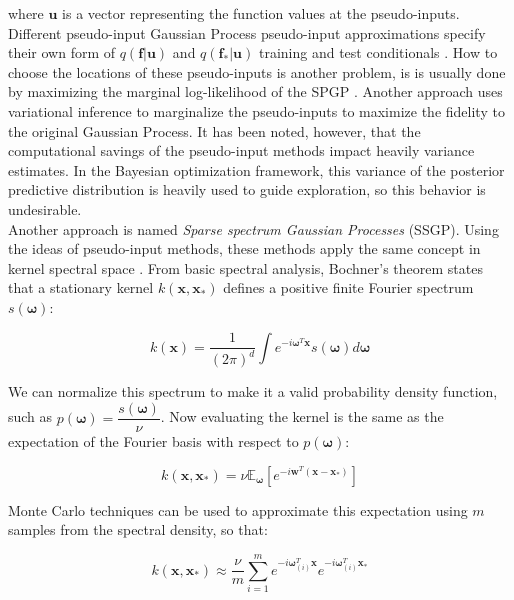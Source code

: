 \documentclass[10pt,a4paper,twoside]{book}
\begin{document}
where $\boldsymbol{u}$ is a vector representing the function values at the pseudo-inputs. Different pseudo-input Gaussian Process pseudo-input approximations specify their own form of $q(\boldsymbol{f}|\boldsymbol{u})$ and $q(\boldsymbol{f_*|u})$ training and test conditionals \cite{Quinonero-candela2005}. How to choose the locations of these pseudo-inputs is another problem, is is usually done by maximizing the marginal log-likelihood of the SPGP \cite{Seeger2003}. Another approach uses variational inference \cite{Titsias2009} to marginalize the pseudo-inputs to maximize the fidelity to the original Gaussian Process. It has been noted, however, that the computational savings of the pseudo-input methods impact heavily variance estimates. In the Bayesian optimization framework, this variance of the posterior predictive distribution is heavily used to guide exploration, so this behavior is undesirable.\\

Another approach is named \textit{Sparse spectrum Gaussian Processes} (SSGP). Using the ideas of pseudo-input methods, these methods apply the same concept in kernel spectral space \cite{Lazaro-Gredilla2010}. From basic spectral analysis, Bochner's theorem states that a stationary kernel $k(\boldsymbol{x}, \boldsymbol{x}_*)$ defines a positive finite Fourier spectrum $s(\boldsymbol{\omega})$:

\begin{equation}
k(\boldsymbol{x}) = \dfrac{1}{(2\pi)^d}\int e^{-i\boldsymbol{\omega}^T\boldsymbol{x}}s(\boldsymbol{\omega}) d\boldsymbol{\omega}
\end{equation}

We can normalize this spectrum to make it a valid probability density function, such as $p(\boldsymbol{\omega}) = \dfrac{s(\boldsymbol{\omega})}{\nu}$. Now evaluating the kernel is the same as the expectation of the Fourier basis with respect to $p(\boldsymbol{\omega})$:

\begin{equation}
k(\boldsymbol{x}, \boldsymbol{x_*}) = \nu \mathbb{E}_{\boldsymbol{\omega}}\left[ e^{-i\boldsymbol{w}^T(\boldsymbol{x} - \boldsymbol{x}_*)}   \right]
\end{equation}

Monte Carlo techniques can be used to approximate this expectation using $m$ samples from the spectral density, so that:

\begin{equation}
k(\boldsymbol{x}, \boldsymbol{x_*}) \approx \dfrac{\nu}{m}\sum_{i=1}^m e^{-i\boldsymbol{\omega}_{(i)}^T\boldsymbol{x}} e^{-i\boldsymbol{\omega}_{(i)}^T\boldsymbol{x_*}} 
\end{equation}
\end{document}
